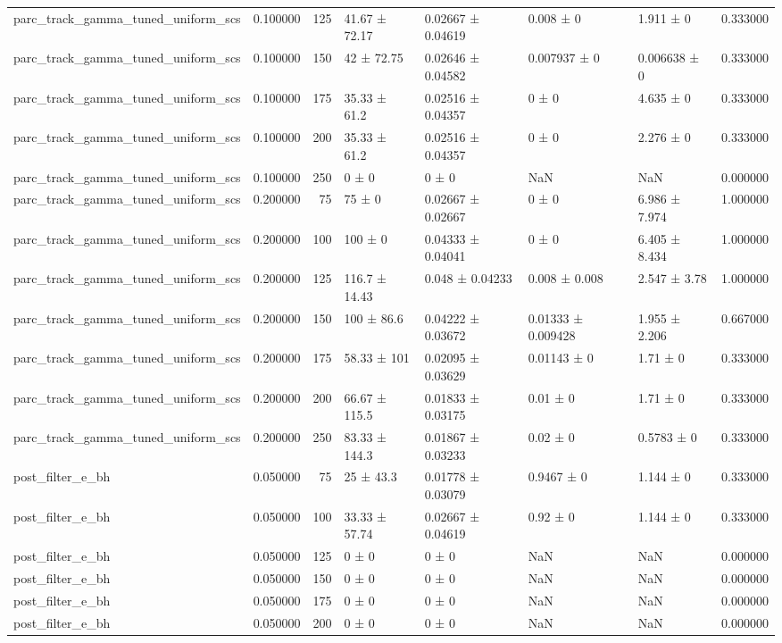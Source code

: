 \begin{tabular}{lrrllllr}
parc_track_gamma_tuned_uniform_scs & 0.100000 & 125 & 41.67 ± 72.17 & 0.02667 ± 0.04619 & 0.008 ± 0 & 1.911 ± 0 & 0.333000 \\
parc_track_gamma_tuned_uniform_scs & 0.100000 & 150 & 42 ± 72.75 & 0.02646 ± 0.04582 & 0.007937 ± 0 & 0.006638 ± 0 & 0.333000 \\
parc_track_gamma_tuned_uniform_scs & 0.100000 & 175 & 35.33 ± 61.2 & 0.02516 ± 0.04357 & 0 ± 0 & 4.635 ± 0 & 0.333000 \\
parc_track_gamma_tuned_uniform_scs & 0.100000 & 200 & 35.33 ± 61.2 & 0.02516 ± 0.04357 & 0 ± 0 & 2.276 ± 0 & 0.333000 \\
parc_track_gamma_tuned_uniform_scs & 0.100000 & 250 & 0 ± 0 & 0 ± 0 & NaN & NaN & 0.000000 \\
parc_track_gamma_tuned_uniform_scs & 0.200000 & 75 & 75 ± 0 & 0.02667 ± 0.02667 & 0 ± 0 & 6.986 ± 7.974 & 1.000000 \\
parc_track_gamma_tuned_uniform_scs & 0.200000 & 100 & 100 ± 0 & 0.04333 ± 0.04041 & 0 ± 0 & 6.405 ± 8.434 & 1.000000 \\
parc_track_gamma_tuned_uniform_scs & 0.200000 & 125 & 116.7 ± 14.43 & 0.048 ± 0.04233 & 0.008 ± 0.008 & 2.547 ± 3.78 & 1.000000 \\
parc_track_gamma_tuned_uniform_scs & 0.200000 & 150 & 100 ± 86.6 & 0.04222 ± 0.03672 & 0.01333 ± 0.009428 & 1.955 ± 2.206 & 0.667000 \\
parc_track_gamma_tuned_uniform_scs & 0.200000 & 175 & 58.33 ± 101 & 0.02095 ± 0.03629 & 0.01143 ± 0 & 1.71 ± 0 & 0.333000 \\
parc_track_gamma_tuned_uniform_scs & 0.200000 & 200 & 66.67 ± 115.5 & 0.01833 ± 0.03175 & 0.01 ± 0 & 1.71 ± 0 & 0.333000 \\
parc_track_gamma_tuned_uniform_scs & 0.200000 & 250 & 83.33 ± 144.3 & 0.01867 ± 0.03233 & 0.02 ± 0 & 0.5783 ± 0 & 0.333000 \\
post_filter_e_bh & 0.050000 & 75 & 25 ± 43.3 & 0.01778 ± 0.03079 & 0.9467 ± 0 & 1.144 ± 0 & 0.333000 \\
post_filter_e_bh & 0.050000 & 100 & 33.33 ± 57.74 & 0.02667 ± 0.04619 & 0.92 ± 0 & 1.144 ± 0 & 0.333000 \\
post_filter_e_bh & 0.050000 & 125 & 0 ± 0 & 0 ± 0 & NaN & NaN & 0.000000 \\
post_filter_e_bh & 0.050000 & 150 & 0 ± 0 & 0 ± 0 & NaN & NaN & 0.000000 \\
post_filter_e_bh & 0.050000 & 175 & 0 ± 0 & 0 ± 0 & NaN & NaN & 0.000000 \\
post_filter_e_bh & 0.050000 & 200 & 0 ± 0 & 0 ± 0 & NaN & NaN & 0.000000 \\

\end{tabular}
